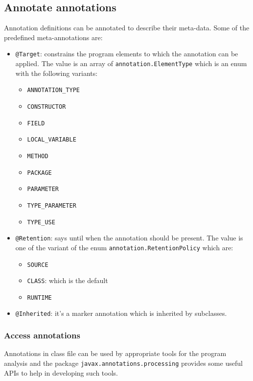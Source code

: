 \subsection{Annotate annotations}
Annotation definitions can be annotated to describe their meta-data.
Some of the predefined meta-annotations are:
\begin{itemize}
    \item \verb|@Target|: constrains the program elements to which the annotation can be applied.
    The value is an array of \verb|annotation.ElementType| which is an enum with the following variants:
    \begin{itemize}
        \item \verb|ANNOTATION_TYPE|
        \item \verb|CONSTRUCTOR|
        \item \verb|FIELD|
        \item \verb|LOCAL_VARIABLE|
        \item \verb|METHOD|
        \item \verb|PACKAGE|
        \item \verb|PARAMETER|
        \item \verb|TYPE_PARAMETER|
        \item \verb|TYPE_USE|
    \end{itemize}

    \item \verb|@Retention|: says until when the annotation should be present.
    The value is one of the variant of the enum \verb|annotation.RetentionPolicy| which are:
    \begin{itemize}
        \item \verb|SOURCE|
        \item \verb|CLASS|: which is the default
        \item \verb|RUNTIME|
    \end{itemize}
    
    \item \verb|@Inherited|: it's a marker annotation which is inherited by subclasses.
\end{itemize}

\subsubsection{Access annotations}
Annotations in class file can be used by appropriate tools for the program analysis and the package \verb|javax.annotations.processing| provides some useful APIs to help in developing such tools.

